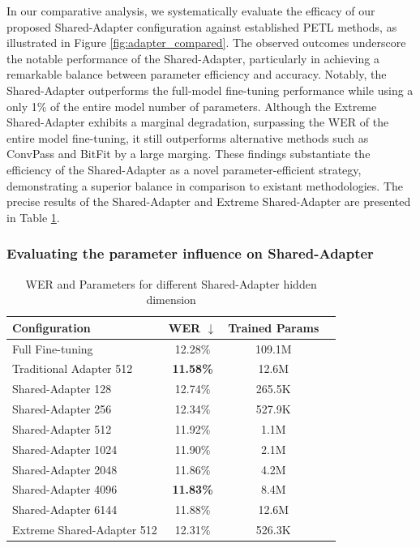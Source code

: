 In our comparative analysis, we systematically evaluate the efficacy of our proposed Shared-Adapter configuration against established \ac{PETL} methods, as illustrated in Figure \ref{fig:adapter_compared}. The observed outcomes underscore the notable performance of the Shared-Adapter, particularly in achieving a remarkable balance between parameter efficiency and accuracy. Notably, the Shared-Adapter outperforms the full-model fine-tuning performance while using a only 1\% of the entire model number of parameters. Although the Extreme Shared-Adapter exhibits a marginal degradation, surpassing the \ac{WER} of the entire model fine-tuning, it still outperforms alternative methods such as ConvPass and BitFit by a large marging. These findings substantiate the efficiency of the Shared-Adapter as a novel parameter-efficient strategy, demonstrating a superior balance in comparison to existant methodologies. The precise results of the Shared-Adapter and Extreme Shared-Adapter are presented in Table \ref{tab:shared_adapter_results}.

\subsubsection{Evaluating the parameter influence on Shared-Adapter}
\begin{table}[ht]
    \centering
    \begin{tabular}{l c c c}
        \hline
        \textbf{Configuration} & \textbf{WER $\downarrow$} & \textbf{Trained Params} \\
        \hline
        Full Fine-tuning & 12.28\% & 109.1M \\ \hline
        Traditional Adapter 512 & \textbf{11.58\%} & 12.6M \\ \hline
        Shared-Adapter 128 & 12.74\% & 265.5K \\
        Shared-Adapter 256 & 12.34\% & 527.9K \\
        Shared-Adapter 512 & 11.92\% & 1.1M \\
        Shared-Adapter 1024 & 11.90\% & 2.1M \\
        Shared-Adapter 2048 & 11.86\% & 4.2M \\
        Shared-Adapter 4096 & \textbf{11.83\%} & 8.4M \\
        Shared-Adapter 6144 & 11.88\% & 12.6M \\ \hline
        Extreme Shared-Adapter  512& 12.31\% & 526.3K \\ \hline
    \end{tabular}
    \caption{WER and Parameters for different Shared-Adapter hidden dimension}
    \label{tab:shared_adapter_results}
\end{table}



